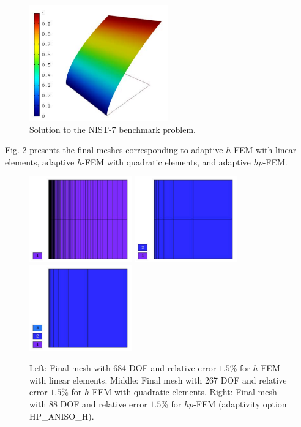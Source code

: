 \documentclass[12pt]{elsarticle}
\begin{document}
\begin{figure}[H]
\centering
\includegraphics[height=5cm]{mafig41.pdf}
\vspace{-3mm}
\caption{Solution to the NIST-7 benchmark problem.}
\label{fig:sln-nist07}
\end{figure}

Fig. \ref{fig:nist-7-hp-aniso} presents the final meshes corresponding to adaptive $h$-FEM with
linear elements, adaptive $h$-FEM with quadratic elements, and adaptive $hp$-FEM.

\begin{figure}[H]
\centering
\includegraphics[height=3.7cm]{mafig42.pdf}
\includegraphics[height=3.7cm]{mafig43.pdf}
\includegraphics[height=3.7cm]{mafig44.pdf}
\caption{
Left: Final mesh with 684 DOF and relative error $1.5$\% for $h$-FEM with linear elements.
Middle: Final mesh with 267 DOF and relative error $1.5$\% for $h$-FEM with quadratic elements.
Right: Final mesh with 88 DOF and relative error $1.5$\% for $hp$-FEM (adaptivity option HP\_ANISO\_H).}
\label{fig:nist-7-hp-aniso}
\end{figure}
\end{document}

